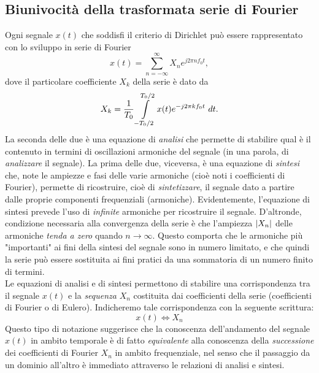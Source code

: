 \documentclass[12pt,oneside,openany]{memoir}
\numberwithin{equation}{subsection}
\DeclarePairedDelimiter{\abs}{\lvert}{\rvert}
\newcommand{\dt}{\ dt}
\begin{document}
\subsection{Biunivocit\`a della trasformata serie di Fourier}
Ogni segnale $x(t)$ che soddisfi il criterio di Dirichlet pu\`o essere rappresentato con lo sviluppo in serie di Fourier
\begin{equation}
	x(t) = \sum_{n = -\infty}^{\infty} X_n e^{j 2 \pi n f_0 t},
\end{equation}
dove il particolare coefficiente $X_k$ della serie \`e dato da
\begin{equation}
	X_k = \frac{1}{T_0} \int\displaylimits_{-T_0/2}^{T_0/2} x(t) e^{-j 2 \pi k f_0 t} \dt.
\end{equation}
La seconda delle due \`e una equazione di \textit{analisi} che permette di stabilire qual \`e il contenuto in termini di oscillazioni armoniche del segnale (in una parola, di \textit{analizzare} il segnale). La prima delle due, viceversa, \`e una equazione di \textit{sintesi} che, note le ampiezze e fasi delle varie armoniche (cio\`e noti i coefficienti di Fourier), permette di ricostruire, cio\`e di \textit{sintetizzare}, il segnale dato a partire dalle proprie componenti frequenziali (armoniche). Evidentemente, l'equazione di sintesi prevede l'uso di \textit{infinite} armoniche per ricostruire il segnale. D'altronde, condizione necessaria alla convergenza della serie \`e che l'ampiezza $\abs{X_n}$ delle armoniche \textit{tenda a zero} quando $n \rightarrow \infty$. Questo comporta che le armoniche pi\`u "importanti" ai fini della sintesi del segnale sono in numero limitato, e che quindi la serie pu\`o essere sostituita ai fini pratici da una sommatoria di un numero finito di termini.\\
Le equazioni di analisi e di sintesi permettono di stabilire una corrispondenza tra il segnale $x(t)$ e la \textit{sequenza} $X_n$ costituita dai coefficienti della serie (coefficienti di Fourier o di Eulero). Indicheremo tale corrispondenza con la seguente scrittura:
\begin{equation}
	x(t) \iff X_n
\end{equation}
Questo tipo di notazione suggerisce che la conoscenza dell'andamento del segnale $x(t)$ in ambito temporale \`e di fatto \textit{equivalente} alla conoscenza della \textit{successione} dei coefficienti di Fourier $X_n$ in ambito frequenziale, nel senso che il passaggio da un dominio all'altro \`e immediato attraverso le relazioni di analisi e sintesi.
\end{document}
